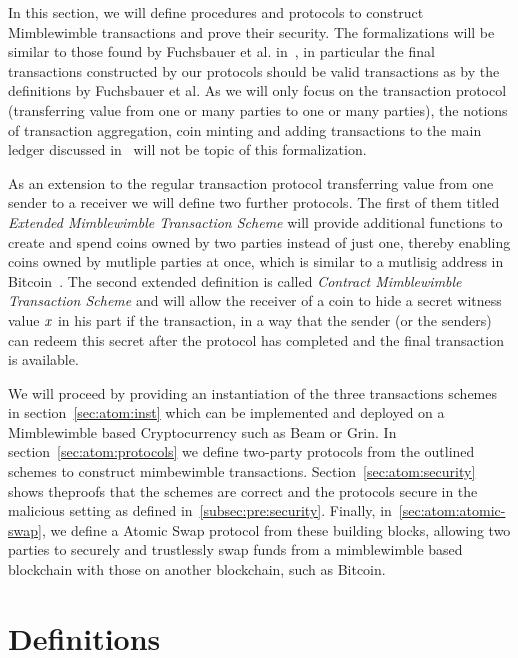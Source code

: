 In this section, we will define procedures and protocols to construct Mimblewimble transactions and prove their security.
The formalizations will be similar to those found by Fuchsbauer et al. in~\cite{fuchsbauer2019aggregate}, in particular the final transactions constructed by our protocols should be valid transactions as by the definitions by Fuchsbauer et al.
As we will only focus on the transaction protocol (transferring value from one or many parties to one or many parties), the notions of transaction aggregation, coin minting and adding transactions to the main ledger discussed in~\cite{fuchsbauer2019aggregate} will not be topic of this formalization.

As an extension to the regular transaction protocol transferring value from one sender to a receiver we will define two further protocols.
The first of them titled \emph{Extended Mimblewimble Transaction Scheme} will provide additional functions to create and spend coins owned by two parties instead of just one, thereby enabling coins owned by mutliple parties at once, which is similar to a mutlisig address in Bitcoin~\cite{antonopoulos2014mastering}.
The second extended definition is called \emph{Contract Mimblewimble Transaction Scheme} and will allow the receiver
of a coin to hide a secret witness value $\mathit{x}$ in his part if the transaction, in a way that the sender (or the senders) can redeem this secret after the protocol has completed and the final transaction is available.

We will proceed by providing an instantiation of the three transactions schemes in section~\ref{sec:atom:inst} which can be implemented and deployed on a Mimblewimble based Cryptocurrency such as Beam or Grin.
In section~\ref{sec:atom:protocols} we define two-party protocols from the outlined schemes to construct mimbewimble transactions.
Section~\ref{sec:atom:security} shows theproofs that the schemes are correct and the protocols secure in the malicious setting as defined in~\ref{subsec:pre:security}.
Finally, in~\ref{sec:atom:atomic-swap}, we define a Atomic Swap protocol from these building blocks, allowing two parties to securely and trustlessly swap funds from a mimblewimble based blockchain with those on another blockchain, such as Bitcoin.

\section{Definitions}\label{sec:atom:definitions}



